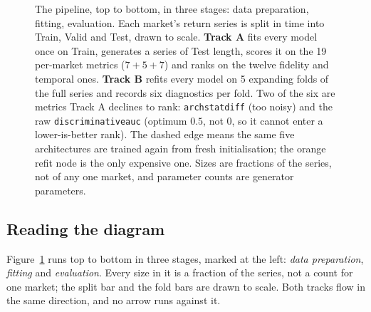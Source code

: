 \documentclass[11pt,a4paper]{article}
\makeatletter
\DeclareRobustCommand{\_}{\ifmmode\nfss@text{\textunderscore}\else\textunderscore\allowbreak\fi}
\makeatother
\begin{document}
\begin{figure}[p]
{}
\caption{The pipeline, top to bottom, in three stages: data preparation, fitting, evaluation. Each market's return series is split in time into Train, Valid and Test, drawn to scale. \textbf{Track A} fits every model once on Train, generates a series of Test length, scores it on the 19 per-market metrics (\(7+5+7\)) and ranks on the twelve fidelity and temporal ones. \textbf{Track B} refits every model on 5 expanding folds of the full series and records six diagnostics per fold. Two of the six are metrics Track A declines to rank: \texttt{arch\_stat\_diff} (too noisy) and the raw \texttt{discriminative\_auc} (optimum $0.5$, not $0$, so it cannot enter a lower-is-better rank). The dashed edge means the same five architectures are trained again from fresh initialisation; the orange refit node is the only expensive one. Sizes are fractions of the series, not of any one market, and parameter counts are generator parameters.}
\label{fig:pipeline}
\end{figure}

\subsection{Reading the diagram}
\label{sec:pipeline-reading}
Figure~\ref{fig:pipeline} runs top to bottom in three stages, marked at the left: \emph{data preparation}, \emph{fitting} and \emph{evaluation}. Every size in it is a fraction of the series, not a count for one market; the split bar and the fold bars are drawn to scale. Both tracks flow in the same direction, and no arrow runs against it.
\end{document}
